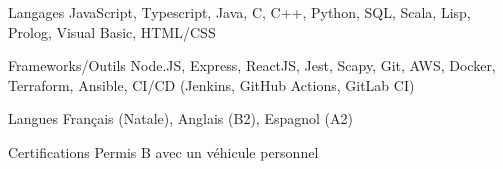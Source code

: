 
\begin{cvskills}
  \cvskill
    {Langages} %
    {JavaScript, Typescript, Java, C, C++, Python, SQL, Scala, Lisp, Prolog, Visual Basic, HTML/CSS} %

  \cvskill
    {Frameworks/Outils} %
    {Node.JS, Express, ReactJS, Jest, Scapy, Git, AWS, Docker, Terraform, Ansible, CI/CD (Jenkins, GitHub Actions, GitLab CI)} %
    
  \cvskill
    {Langues} %
    {Français (Natale), Anglais (B2), Espagnol (A2)} %
    
  \cvskill
    {Certifications} %
    {Permis B avec un véhicule personnel} %
\end{cvskills}

